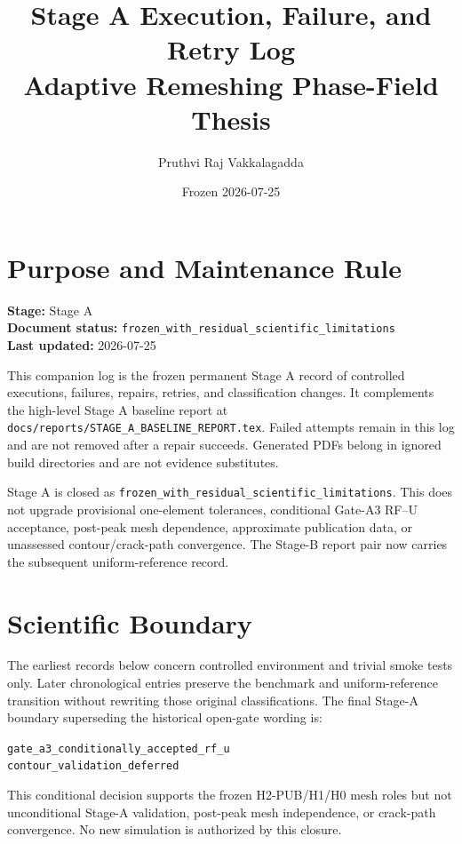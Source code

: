 \documentclass[11pt,a4paper]{article}
\title{Stage A Execution, Failure, and Retry Log\\Adaptive Remeshing Phase-Field Thesis}
\author{Pruthvi Raj Vakkalagadda}
\date{Frozen 2026-07-25}
\begin{document}
\maketitle

\section*{Purpose and Maintenance Rule}

\noindent\textbf{Stage:} Stage A\\
\textbf{Document status:} \texttt{frozen\_with\_residual\_scientific\_limitations}\\
\textbf{Last updated:} 2026-07-25

\medskip

This companion log is the frozen permanent Stage A record of controlled
executions, failures, repairs, retries, and classification changes. It
complements the high-level Stage A baseline report at
\texttt{docs/reports/STAGE\_A\_BASELINE\_REPORT.tex}. Failed attempts remain
in this log and are not removed after a repair succeeds. Generated PDFs belong
in ignored build directories and are not evidence substitutes.

Stage A is closed as
\texttt{frozen\_with\_residual\_scientific\_limitations}. This does not
upgrade provisional one-element tolerances, conditional Gate-A3 RF--U
acceptance, post-peak mesh dependence, approximate publication data, or
unassessed contour/crack-path convergence. The Stage-B report pair now carries
the subsequent uniform-reference record.

\section*{Scientific Boundary}

The earliest records below concern controlled environment and trivial smoke
tests only. Later chronological entries preserve the benchmark and
uniform-reference transition without rewriting those original classifications.
The final Stage-A boundary superseding the historical open-gate wording is:

\begin{center}
\texttt{gate\_a3\_conditionally\_accepted\_rf\_u}\\
\texttt{contour\_validation\_deferred}
\end{center}

This conditional decision supports the frozen H2-PUB/H1/H0 mesh roles but not
unconditional Stage-A validation, post-peak mesh independence, or crack-path
convergence. No new simulation is authorized by this closure.
\end{document}

